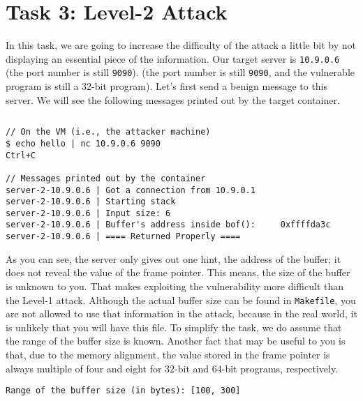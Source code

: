 \section{Task 3: Level-2 Attack} 

In this task, we are going to increase the difficulty
of the attack a little bit by not displaying an essential 
piece of the information. Our target server is 
\texttt{10.9.0.6} 
\ifdefined\arm
(the port number is still \texttt{9090}).
\else
(the port number is still \texttt{9090}, and
the vulnerable program is still a 32-bit program). 
\fi
Let's first send a benign message to this server. 
We will see the following messages printed out by the target container. 


\ifdefined\arm

\begin{lstlisting}
\end{lstlisting}
 
\else

\begin{lstlisting}
// On the VM (i.e., the attacker machine)
$ echo hello | nc 10.9.0.6 9090
Ctrl+C

// Messages printed out by the container
server-2-10.9.0.6 | Got a connection from 10.9.0.1
server-2-10.9.0.6 | Starting stack
server-2-10.9.0.6 | Input size: 6
server-2-10.9.0.6 | Buffer's address inside bof():     0xffffda3c
server-2-10.9.0.6 | ==== Returned Properly ====
\end{lstlisting}

\fi 
 
As you can see, the server only gives out one hint, the 
address of the buffer; it does not reveal the value of the 
frame pointer. This means, the size of the buffer is unknown
to you. That makes exploiting the vulnerability more 
difficult than the Level-1 attack. 
Although the actual buffer size can be found in 
\texttt{Makefile}, you are not allowed to use that 
information in the attack, because in the real world, it is 
unlikely that you will have this file. 
To simplify the task, we do assume that 
the range of the buffer size is known.
Another fact that
may be useful to you is that, due to the memory alignment,
the value stored in the
frame pointer is always multiple of four and eight
for 32-bit and 64-bit programs, respectively.



\begin{lstlisting}
Range of the buffer size (in bytes): [100, 300]
\end{lstlisting}
 


